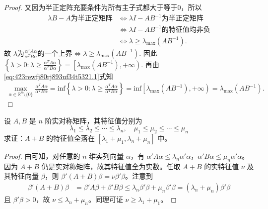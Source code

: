 \documentclass[../../main.tex]{subfiles}%
\begin{document}
\begin{proof}
又因为半正定阵充要条件为所有主子式都大于等于$0$，所以
\begin{align*}
\lambda B-A\text{为半正定矩阵}&\Longleftrightarrow \lambda I-AB^{-1}\text{为半正定矩阵} \\
&\Longleftrightarrow \lambda I-AB^{-1}\text{的特征值均非负} \\
&\Longleftrightarrow \lambda \geqslant \lambda _{\max}\left( AB^{-1} \right) .
\end{align*}
故
$\lambda \text{为}\frac{\alpha ^TA\alpha}{\alpha ^TB\alpha}\text{的一个上界}\Longleftrightarrow \lambda \geqslant \lambda _{\max}\left( AB^{-1} \right) .$
因此
$\left\{ \lambda >0:\lambda \geqslant \frac{\alpha ^TA\alpha}{\alpha ^TB\alpha} \right\} =\left[ \lambda _{\max}\left( AB^{-1} \right) ,+\infty \right) .$
再由\eqref{eq:423rewfj80rj893uf34t5321.1}式知
\begin{align*}
\max_{\alpha \in \mathbb{R} ^n\setminus \{0\}} \frac{\alpha ^TA\alpha}{\alpha ^TB\alpha}=\mathrm{inf}\left\{ \lambda >0:\lambda \geqslant \frac{\alpha ^TA\alpha}{\alpha ^TB\alpha} \right\} =\mathrm{inf}\left[ \lambda _{\max}\left( AB^{-1} \right) ,+\infty \right) =\lambda _{\max}\left( AB^{-1} \right) .
\end{align*}
\end{proof}

\begin{example}\label{example:例9.53}
设 \(A,B\) 是 \(n\) 阶实对称矩阵，其特征值分别为
\[
\lambda_1 \leqslant  \lambda_2 \leqslant  \cdots \leqslant  \lambda_n,\quad \mu_1 \leqslant  \mu_2 \leqslant  \cdots \leqslant  \mu_n
\]
求证：\(A + B\) 的特征值全落在 \([\lambda_1 + \mu_1,\lambda_n + \mu_n]\) 中。
\end{example}
\begin{proof}
由可知，对任意的 \(n\) 维实列向量 \(\alpha\)，有 \(\alpha'A\alpha \leqslant  \lambda_n\alpha'\alpha\)，\(\alpha'B\alpha \leqslant  \mu_n\alpha'\alpha\)。因为 \(A + B\) 仍是实对称矩阵，故其特征值全为实数。任取 \(A + B\) 的实特征值 \(\nu\) 及其特征向量 \(\beta\)，则 \(\beta'(A + B)\beta = \nu\beta'\beta\)。注意到
\begin{align*}
\beta'(A + B)\beta &= \beta'A\beta + \beta'B\beta \leqslant  \lambda_n\beta'\beta + \mu_n\beta'\beta = (\lambda_n + \mu_n)\beta'\beta
\end{align*}
且 \(\beta'\beta > 0\)，故 \(\nu \leqslant  \lambda_n + \mu_n\)。同理可证 \(\nu \geqslant  \lambda_1 + \mu_1\)。 
\end{proof}
\end{document}
